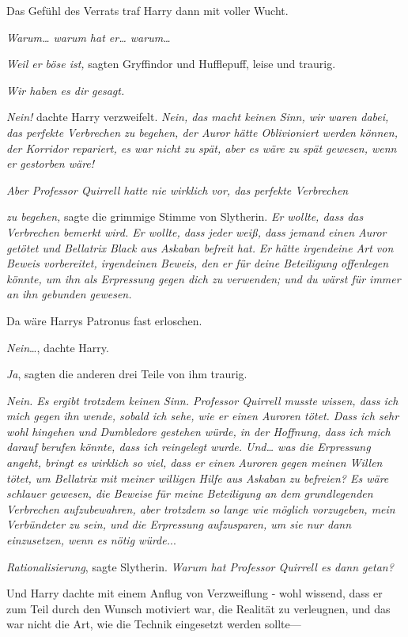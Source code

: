 {Das Gefühl des Verrats traf Harry dann mit voller Wucht.

\emph{Warum… warum hat er… warum…}

\emph{Weil er böse ist,} sagten Gryffindor und Hufflepuff, leise und traurig.

\emph{Wir haben es dir gesagt.}

\emph{Nein!} dachte Harry verzweifelt. \emph{Nein, das macht keinen Sinn, wir waren dabei, das perfekte Verbrechen zu begehen, der Auror hätte Oblivioniert werden können, der Korridor repariert, es war nicht zu spät, aber es wäre zu spät gewesen, wenn er gestorben wäre!}

\emph{Aber Professor Quirrell hatte nie wirklich vor, das perfekte Verbrechen}

\emph{zu begehen,} sagte die grimmige Stimme von Slytherin. \emph{Er wollte, dass das Verbrechen bemerkt wird. Er wollte, dass jeder weiß, dass jemand einen Auror getötet und Bellatrix Black aus Askaban befreit hat.} \emph{Er hätte irgendeine Art von} \emph{Beweis vorbereitet, irgendeinen Beweis, den er für deine Beteiligung offenlegen könnte, um ihn als Erpressung gegen dich zu verwenden; und du wärst für immer an ihn gebunden gewesen.}

Da wäre Harrys Patronus fast erloschen.

\emph{Nein}…, dachte Harry.

\emph{Ja}, sagten die anderen drei Teile von ihm traurig.

\emph{Nein. Es ergibt trotzdem keinen Sinn. Professor Quirrell musste wissen, dass ich mich gegen ihn wende, sobald ich sehe, wie er einen Auroren tötet. Dass ich sehr wohl hingehen und Dumbledore gestehen würde, in der Hoffnung, dass ich mich darauf berufen könnte, dass ich reingelegt wurde. Und… was die Erpressung angeht, bringt es wirklich so viel, dass er einen Auroren gegen meinen Willen tötet, um Bellatrix mit meiner willigen Hilfe aus Askaban zu befreien? Es wäre schlauer gewesen, die Beweise für meine Beteiligung an dem grundlegenden Verbrechen aufzubewahren, aber trotzdem so lange wie möglich vorzugeben, mein Verbündeter zu sein, und die Erpressung aufzusparen, um sie nur dann einzusetzen, wenn es nötig würde.}..

\emph{Rationalisierung}, sagte Slytherin. \emph{Warum hat Professor Quirrell es dann getan?}

Und Harry dachte mit einem Anflug von Verzweiflung - wohl wissend, dass er zum Teil durch den Wunsch motiviert war, die Realität zu verleugnen, und das war nicht die Art, wie die Technik eingesetzt werden sollte—

}
